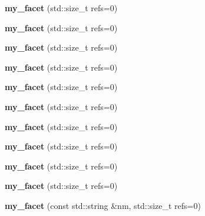 \begin{DoxyCompactItemize}
\mbox{\label{structmy__facet_aff29b1cbf5e107557c0f3763905c67c0}} 
{\bfseries my\+\_\+facet} (std\+::size\+\_\+t refs=0)
\item 
\mbox{\label{structmy__facet_aff29b1cbf5e107557c0f3763905c67c0}} 
{\bfseries my\+\_\+facet} (std\+::size\+\_\+t refs=0)
\item 
\mbox{\label{structmy__facet_aff29b1cbf5e107557c0f3763905c67c0}} 
{\bfseries my\+\_\+facet} (std\+::size\+\_\+t refs=0)
\item 
\mbox{\label{structmy__facet_aff29b1cbf5e107557c0f3763905c67c0}} 
{\bfseries my\+\_\+facet} (std\+::size\+\_\+t refs=0)
\item 
\mbox{\label{structmy__facet_aff29b1cbf5e107557c0f3763905c67c0}} 
{\bfseries my\+\_\+facet} (std\+::size\+\_\+t refs=0)
\item 
\mbox{\label{structmy__facet_aff29b1cbf5e107557c0f3763905c67c0}} 
{\bfseries my\+\_\+facet} (std\+::size\+\_\+t refs=0)
\item 
\mbox{\label{structmy__facet_aff29b1cbf5e107557c0f3763905c67c0}} 
{\bfseries my\+\_\+facet} (std\+::size\+\_\+t refs=0)
\item 
\mbox{\label{structmy__facet_aff29b1cbf5e107557c0f3763905c67c0}} 
{\bfseries my\+\_\+facet} (std\+::size\+\_\+t refs=0)
\item 
\mbox{\label{structmy__facet_aff29b1cbf5e107557c0f3763905c67c0}} 
{\bfseries my\+\_\+facet} (std\+::size\+\_\+t refs=0)
\item 
\mbox{\label{structmy__facet_aff29b1cbf5e107557c0f3763905c67c0}} 
{\bfseries my\+\_\+facet} (std\+::size\+\_\+t refs=0)
\item 
\mbox{\label{structmy__facet_a6729ecd86319119e683a0c214f4c49ed}} 
{\bfseries my\+\_\+facet} (const std\+::string \&nm, std\+::size\+\_\+t refs=0)
\item 
\mbox{\label{structmy__facet_a6729ecd86319119e683a0c214f4c49ed}} 

\end{DoxyCompactItemize}
